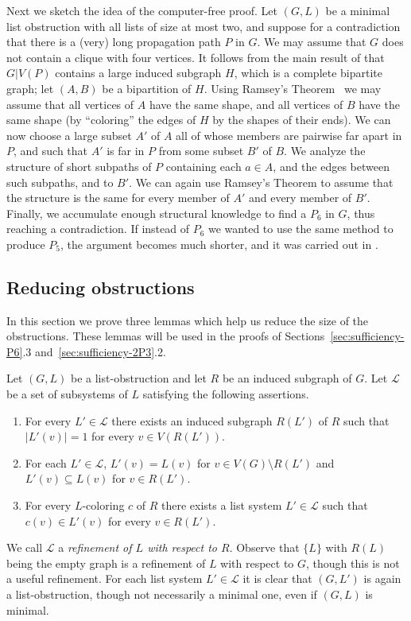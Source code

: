 \documentclass[11pt]{article}
\begin{document}
Next we sketch the idea of the computer-free proof. Let $(G,L)$ be a minimal 
list obstruction with all lists of size at most two, and suppose for a 
contradiction that  there is a (very) long propagation path $P$ in $G$.
We may assume that $G$ does not contain a clique 
with four vertices. It follows from the main result of \cite{GSS} that $G|V(P)$
contains a large induced subgraph $H$, which is a complete bipartite graph;
let $(A,B)$ be a bipartition of $H$. Using Ramsey's Theorem~\cite{Ramsey}  we may assume that
all vertices of $A$ have the same shape, and all vertices of $B$ have the same 
shape (by ``coloring'' the edges of $H$ by the shapes of their ends). We can 
now choose a large subset $A'$ of $A$ all of whose members are pairwise far 
apart  in $P$,  and  such that $A'$ is far in $P$ from some subset  $B'$ of 
$B$. We analyze the structure of short subpaths of $P$ containing each 
$a \in A$,  and the edges between such subpaths, and to $B'$. We can again use 
Ramsey's Theorem to  assume that the structure is the same for every member of 
$A'$ and every member of $B'$. Finally, we accumulate enough structural 
knowledge to find a $P_6$ in $G$, thus reaching a contradiction. 
If instead of $P_6$ we wanted to use the same method to produce $P_5$, the 
argument becomes much shorter, and it was carried out in \cite{Zhang}.
 
\subsection{Reducing obstructions}
In this section we prove three lemmas which help us reduce the size of the obstructions.
These lemmas will be used in the proofs of Sections~\ref{sec:sufficiency-P6}.3 and~\ref{sec:sufficiency-2P3}.2. 

Let $(G,L)$ be a list-obstruction and let $R$ be an induced subgraph of $G$. Let $\mathcal{L}$ be a set of subsystems of $L$ satisfying the following assertions.
\begin{enumerate}
\item For every $L' \in \mathcal{L}$ there exists an induced subgraph $R(L')$ of $R$ such that $|L'(v)|=1$ for every $v \in V(R(L'))$.	
\item For each $L'\in \mathcal{L}$, $L'(v)=L(v)$ for $v\in V(G)\setminus R(L')$ and $L'(v)\subseteq L(v)$ for $v\in R(L')$.
\item For every $L$-coloring $c$ of $R$ there exists a list system $L'\in \mathcal{L}$ such that $c(v) \in L'(v)$ for every $v \in R(L')$.
\end{enumerate}
We call $\mathcal L$ a \emph{refinement of $L$ with respect to $R$}.
Observe that $\{L\}$ with $R(L)$ being the empty graph is a refinement of
$L$ with respect to $G$, though this is not a useful refinement.
For each list system $L'\in \mathcal{L}$ it is clear that $(G,L')$ is again a list-obstruction, though not necessarily a minimal one, even if $(G,L)$ is minimal.
\end{document}
